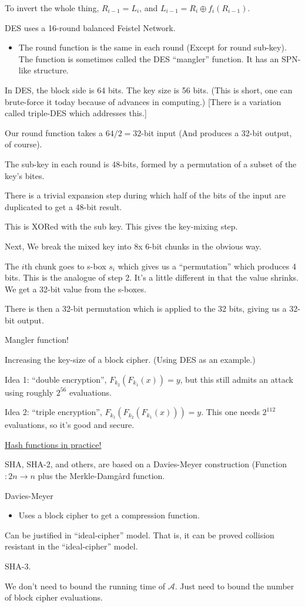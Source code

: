 \documentclass[12pt]{article}
\newcommand{\AAA}{\mathcal{A}}
\newcommand{\xor}{\oplus}
\begin{document}
To invert the whole thing, $R_{i-1}=L_i$, and $L_{i-1}=R_i\xor f_{i}(R_{i-1})$.

DES uses a 16-round balanced Feistel Network.\begin{itemize}

\item The round function is the same in each round (Except for round sub-key). The function is sometimes called the DES ``mangler'' function. It has an SPN-like structure.

\end{itemize}

In DES, the block side is 64 bits. The key size is 56 bits. (This is short, one can brute-force it today because of advances in computing.) [There is a variation called triple-DES which addresses this.]

Our round function takes a $64/2=32$-bit input (And produces a 32-bit output, of course).

The sub-key in each round is 48-bits, formed by a permutation of a subset of the key's bites.

There is a trivial expansion step during which half of the bits of the input are duplicated to get a 48-bit result.

This is XORed with the sub key. This gives the key-mixing step.

Next, We break the mixed key into 8x 6-bit chunks in the obvious way.

The $i$th chunk goes to s-box $s_i$ which gives us a ``permutation'' which produces 4 bits. This is the analogue of step 2. It's a little different in that the value shrinks. We get a 32-bit value from the s-boxes.

There is then a 32-bit permutation which is applied to the 32 bits, giving us a 32-bit output.

Mangler function!

Increasing the key-size of a block cipher. (Using DES as an example.)

Idea 1: ``double encryption'', $F_{k_2}(F_{k_1}(x))=y$, but this still admits an attack using roughly $2^{56}$ evaluations.

Idea 2: ``triple encryption'', $F_{k_1}(F_{k_2}(F_{k_1}(x)))=y$. This one needs $2^{112}$ evaluations, so it's good and secure.

\underline{Hash functions in practice!}

SHA, SHA-2, and others, are based on a Davies-Meyer construction (Function $:2n\to n$ plus the Merkle-Damg\r{a}rd function.

Davies-Meyer\begin{itemize}

\item Uses a block cipher to get a compression function.

\end{itemize}

Can be justified in ``ideal-cipher'' model. That is, it can be proved collision resistant in the ``ideal-cipher'' model.

SHA-3.

We don't need to bound the running time of $\AAA$. Just need to bound the number of block cipher evaluations.
\end{document}

